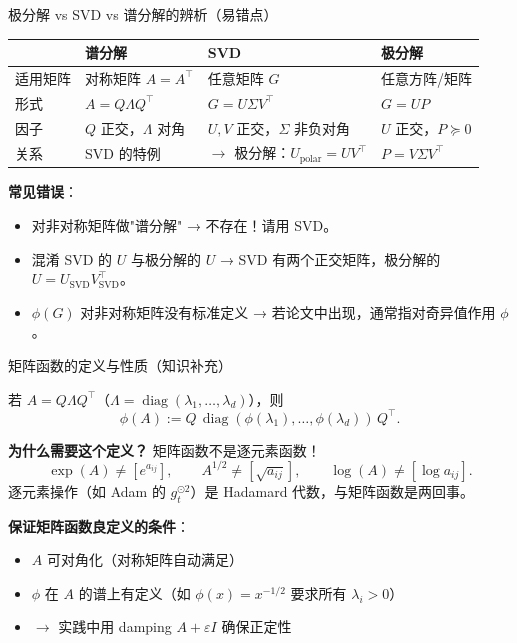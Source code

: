 \documentclass[aspectratio=169,10pt]{ctexbeamer}
\newcommand{\diag}{\operatorname{diag}}
\newcommand{\eps}{\varepsilon}
\begin{document}
\begin{frame}{极分解 vs SVD vs 谱分解的辨析（易错点）}
\begin{center}
\begin{tabular}{p{2.5cm}p{3.5cm}p{3.5cm}p{3cm}}
\toprule
 & \textbf{谱分解} & \textbf{SVD} & \textbf{极分解} \\
\midrule
适用矩阵 & 对称矩阵 $A=A^\top$ & 任意矩阵 $G$ & 任意方阵/矩阵 \\
形式 & $A=Q\Lambda Q^\top$ & $G=U\Sigma V^\top$ & $G=UP$ \\
因子 & $Q$ 正交，$\Lambda$ 对角 & $U,V$ 正交，$\Sigma$ 非负对角 & $U$ 正交，$P\succeq0$ \\
关系 & SVD 的特例 & $\to$ 极分解：$U_{\text{polar}}=UV^\top$ & $P=V\Sigma V^\top$ \\
\bottomrule
\end{tabular}
\end{center}

\vspace{0.3cm}
\textbf{常见错误}：
\begin{itemize}
  \item 对非对称矩阵做"谱分解" → 不存在！请用 SVD。
  \item 混淆 SVD 的 $U$ 与极分解的 $U$ → SVD 有两个正交矩阵，极分解的 $U=U_{\text{SVD}}V_{\text{SVD}}^\top$。
  \item $\phi(G)$ 对非对称矩阵没有标准定义 → 若论文中出现，通常指对奇异值作用 $\phi$。
\end{itemize}
\end{frame}

\begin{frame}{矩阵函数的定义与性质（知识补充）}
\begin{definition}[对称矩阵的函数]
  若 $A=Q\Lambda Q^\top$（$\Lambda=\diag(\lambda_1,\ldots,\lambda_d)$），则
  \[
    \phi(A) := Q\,\diag(\phi(\lambda_1),\ldots,\phi(\lambda_d))\,Q^\top.
  \]
\end{definition}

\vspace{0.15cm}
\textbf{为什么需要这个定义？} 矩阵函数不是逐元素函数！
\[
  \exp(A) \neq [e^{a_{ij}}],\qquad
  A^{1/2} \neq [\sqrt{a_{ij}}],\qquad
  \log(A) \neq [\log a_{ij}].
\]
逐元素操作（如 Adam 的 $g_t^{\odot2}$）是 Hadamard 代数，与矩阵函数是两回事。

\vspace{0.15cm}
\textbf{保证矩阵函数良定义的条件}：
\begin{itemize}
  \item $A$ 可对角化（对称矩阵自动满足）
  \item $\phi$ 在 $A$ 的谱上有定义（如 $\phi(x)=x^{-1/2}$ 要求所有 $\lambda_i>0$）
  \item $\to$ 实践中用 damping $A+\eps I$ 确保正定性
\end{itemize}
\end{frame}
\end{document}
